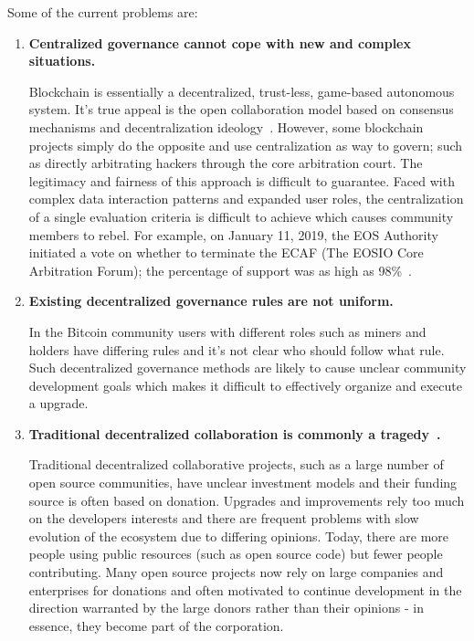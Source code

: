 Some of the current problems are:

\begin{enumerate}
	\item 

	\textbf{Centralized governance cannot cope with new and complex situations.}

	Blockchain is essentially a decentralized, trust-less, game-based autonomous system. It's true appeal is the open collaboration model based on consensus mechanisms and decentralization ideology~\cite{whitepaper}. However, some blockchain projects simply do the opposite and use centralization as way to govern; such as directly arbitrating hackers through the core arbitration court. The legitimacy and fairness of this approach is difficult to guarantee. Faced with complex data interaction patterns and expanded user roles, the centralization of a single evaluation criteria is difficult to achieve which causes community members to rebel. For example, on January 11, 2019, the EOS Authority initiated a vote on whether to terminate the ECAF (The EOSIO Core Arbitration Forum); the percentage of support was as high as 98\%~\cite{DeleteECAF}.

	\item 

	\textbf{Existing decentralized governance rules are not uniform.}

	In the Bitcoin community users with different roles such as miners and holders have differing rules and it's not clear who should follow what rule. Such decentralized governance methods are likely to cause unclear community development goals which makes it difficult to effectively organize and execute a upgrade.

	\item 

	\textbf{Traditional decentralized collaboration is commonly a tragedy~\cite{TragedyOfTheCommons}.}

	Traditional decentralized collaborative projects, such as a large number of open source communities, have unclear investment models and their funding source is often based on donation. Upgrades and improvements rely too much on the developers interests and there are frequent problems with slow evolution of the ecosystem due to differing opinions. Today, there are more people using public resources (such as open source code) but fewer people contributing. Many open source projects now rely on large companies and enterprises for donations and often motivated to continue development in the direction warranted by the large donors rather than their opinions - in essence, they become part of the corporation.


\end{enumerate}
